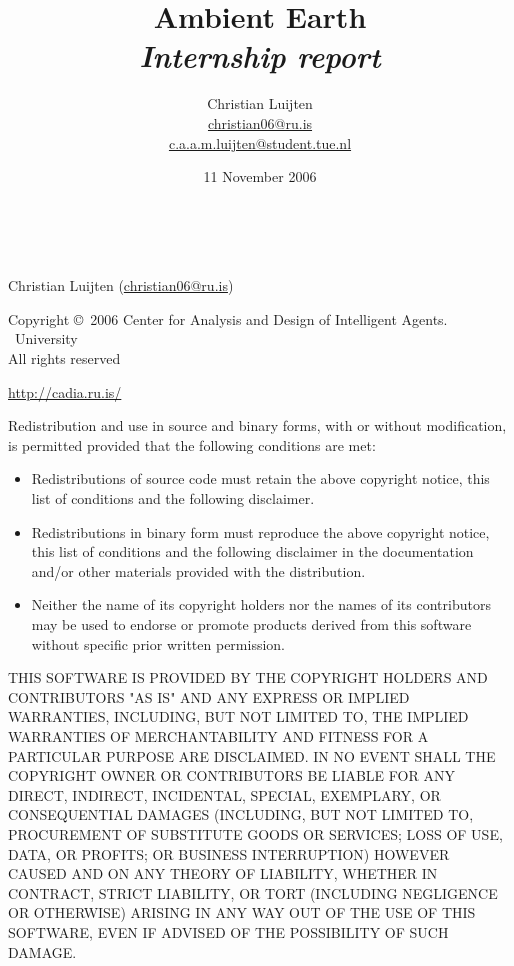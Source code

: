 \documentclass[english,a4paper,twoside]{scrreprt}
\title{Ambient Earth\\
       {\Large \emph{Internship report}}}
\author{Christian Luijten\\\url{christian06@ru.is}\\\url{c.a.a.m.luijten@student.tue.nl}}
\date{11 November 2006}
\begin{document}

\maketitle

\mbox{} \\
\vfill

\begin{adjustwidth}{4em}{4em}
{\scriptsize
  Christian Luijten (\url{christian06@ru.is})

  Copyright \copyright\ 2006 Center for Analysis and Design of Intelligent
  Agents. \\
  \Rvk\ University \\
  All rights reserved

  \url{http://cadia.ru.is/}

  Redistribution and use in source and binary forms, with or without
  modification, is permitted provided that the following conditions are met:

  \begin{itemize}
    \item Redistributions of source code must retain the above copyright
      notice, this list of conditions and the following disclaimer.

    \item Redistributions in binary form must reproduce the above copyright
      notice, this list of conditions and the following disclaimer in the
      documentation and/or other materials provided with the distribution.

    \item Neither the name of its copyright holders nor the names of its
      contributors may be used to endorse or promote products derived from this
      software without specific prior written permission.

  \end{itemize}

  THIS SOFTWARE IS PROVIDED BY THE COPYRIGHT HOLDERS AND CONTRIBUTORS "AS IS"
  AND ANY EXPRESS OR IMPLIED WARRANTIES, INCLUDING, BUT NOT LIMITED TO, THE
  IMPLIED WARRANTIES OF MERCHANTABILITY AND FITNESS FOR A PARTICULAR PURPOSE
  ARE DISCLAIMED. IN NO EVENT SHALL THE COPYRIGHT OWNER OR CONTRIBUTORS BE
  LIABLE FOR ANY DIRECT, INDIRECT, INCIDENTAL, SPECIAL, EXEMPLARY, OR
  CONSEQUENTIAL DAMAGES (INCLUDING, BUT NOT LIMITED TO, PROCUREMENT OF
  SUBSTITUTE GOODS OR SERVICES; LOSS OF USE, DATA, OR PROFITS; OR BUSINESS
  INTERRUPTION) HOWEVER CAUSED AND ON ANY THEORY OF LIABILITY, WHETHER IN
  CONTRACT, STRICT LIABILITY, OR TORT (INCLUDING NEGLIGENCE OR OTHERWISE)
  ARISING IN ANY WAY OUT OF THE USE OF THIS SOFTWARE, EVEN IF ADVISED OF THE
  POSSIBILITY OF SUCH DAMAGE.
}
\end{adjustwidth}
\end{document}
